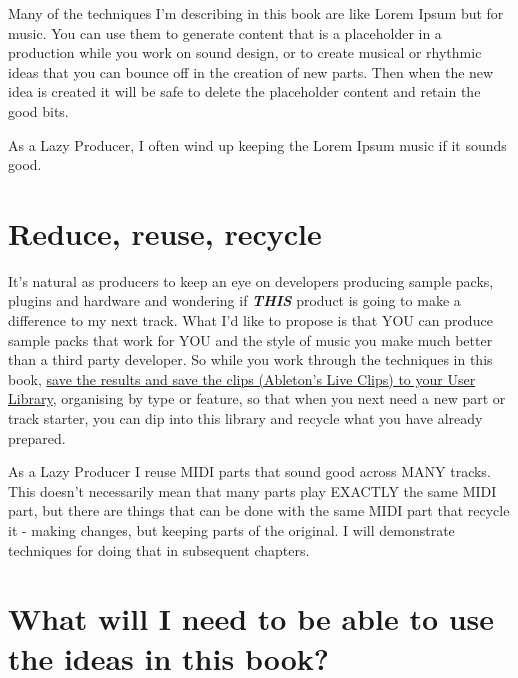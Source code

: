 \documentclass[
  12pt,
  letterpaper,
  oneside,
  open=any]{scrbook}
\begin{document}
Many of the techniques I'm describing in this book are like Lorem Ipsum
but for music. You can use them to generate content that is a
placeholder in a production while you work on sound design, or to create
musical or rhythmic ideas that you can bounce off in the creation of new
parts. Then when the new idea is created it will be safe to delete the
placeholder content and retain the good bits.

As a Lazy Producer, I often wind up keeping the Lorem Ipsum music if it
sounds good.

\section*{Reduce, reuse, recycle}\label{reduce-reuse-recycle}


It's natural as producers to keep an eye on developers producing sample
packs, plugins and hardware and wondering if \textbf{\emph{THIS}}
product is going to make a difference to my next track. What I'd like to
propose is that YOU can produce sample packs that work for YOU and the
style of music you make much better than a third party developer. So
while you work through the techniques in this book,
\href{https://www.ableton.com/en/live-manual/12/managing-files-and-sets/\#live-clips}{save
the results and save the clips (Ableton's Live Clips) to your User
Library}, organising by type or feature, so that when you next need a
new part or track starter, you can dip into this library and recycle
what you have already prepared.

As a Lazy Producer I reuse MIDI parts that sound good across MANY
tracks. This doesn't necessarily mean that many parts play EXACTLY the
same MIDI part, but there are things that can be done with the same MIDI
part that recycle it - making changes, but keeping parts of the
original. I will demonstrate techniques for doing that in subsequent
chapters.

\section*{What will I need to be able to use the ideas in this
book?}\label{what-will-i-need-to-be-able-to-use-the-ideas-in-this-book}

\end{document}
